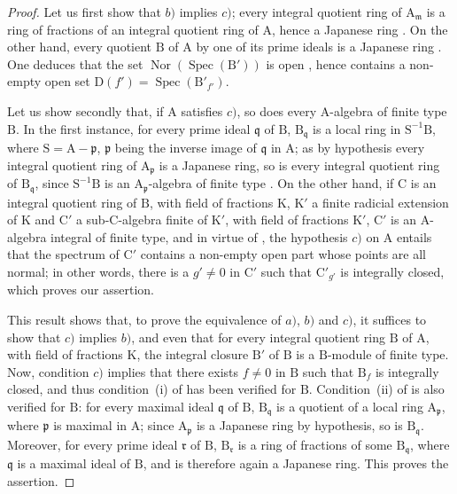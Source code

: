 \begin{proof}
Let us first show that $b)$ implies $c)$; every integral quotient ring of $\mathrm{A}_\mathfrak{m}$ is a ring of fractions of an integral quotient ring of $\mathrm{A}$, hence a Japanese ring . On the other hand, every quotient $\mathrm{B}$ of $\mathrm{A}$ by one of its prime ideals is a Japanese ring . One deduces that the set $\operatorname{Nor}(\operatorname{Spec}(\mathrm{B}'))$ is open , hence contains a non-empty open set $\mathrm{D}(f')=\operatorname{Spec}(\mathrm{B}'_{f'})$.


Let us show secondly that, if $\mathrm{A}$ satisfies $c)$, so does every $\mathrm{A}$-algebra of finite type $\mathrm{B}$. In the first instance, for every prime ideal $\mathfrak{q}$ of $\mathrm{B}$, $\mathrm{B}_\mathfrak{q}$ is a local ring in $\mathrm{S}^{-1}\mathrm{B}$, where $\mathrm{S}=\mathrm{A}-\mathfrak{p}$, $\mathfrak{p}$ being the inverse image of $\mathfrak{q}$ in $\mathrm{A}$; as by hypothesis every integral quotient ring of $\mathrm{A}_\mathfrak{p}$ is a Japanese ring, so is every integral quotient ring of $\mathrm{B}_\mathfrak{q}$, since $\mathrm{S}^{-1}\mathrm{B}$ is an $\mathrm{A}_\mathfrak{p}$-algebra of finite type . On the other hand, if $\mathrm{C}$ is an integral quotient ring of $\mathrm{B}$, with field of fractions $\mathrm{K}$, $\mathrm{K}'$ a finite radicial extension of $\mathrm{K}$ and $\mathrm{C}'$ a sub-$\mathrm{C}$-algebra finite of $\mathrm{K}'$, with field of fractions $\mathrm{K}'$, $\mathrm{C}'$ is an $\mathrm{A}$-algebra integral of finite type, and in virtue of , the hypothesis $c)$ on $\mathrm{A}$ entails that the spectrum of $\mathrm{C}'$ contains a non-empty open part whose points are all normal; in other words, there is a $g'\neq 0$ in $\mathrm{C}'$ such that $\mathrm{C}'_{g'}$ is integrally closed, which proves our assertion.

This result shows that, to prove the equivalence of $a)$, $b)$ and $c)$, it suffices to show that $c)$ implies $b)$, and even that for every integral quotient ring $\mathrm{B}$ of $\mathrm{A}$, with field of fractions $\mathrm{K}$, the integral closure $\mathrm{B}'$ of $\mathrm{B}$ is a $\mathrm{B}$-module of finite type. Now, condition $c)$ implies that there exists $f\neq0$ in $\mathrm{B}$ such that $\mathrm{B}_f$ is integrally closed, and thus condition~(i) of  has been verified for $\mathrm{B}$. Condition~(ii) of  is also verified for $\mathrm{B}$: for every maximal ideal $\mathfrak{q}$ of $\mathrm{B}$, $\mathrm{B}_\mathfrak{q}$ is a quotient of a local ring $\mathrm{A}_\mathfrak{p}$, where $\mathfrak{p}$ is maximal in $\mathrm{A}$; since $\mathrm{A}_\mathfrak{p}$ is a Japanese ring by hypothesis, so is $\mathrm{B}_\mathfrak{q}$. Moreover, for every prime ideal $\mathfrak{r}$ of $\mathrm{B}$, $\mathrm{B}_\mathfrak{r}$ is a ring of fractions of some $\mathrm{B}_\mathfrak{q}$, where $\mathfrak{q}$ is a maximal ideal of $\mathrm{B}$, and is therefore again a Japanese ring. This proves the assertion.


\end{proof}
